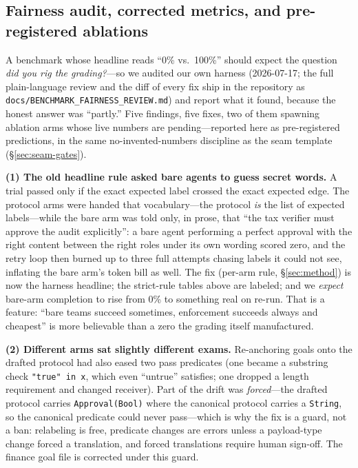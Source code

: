 \documentclass{article}
\begin{document}
\subsection{Fairness audit, corrected metrics, and pre-registered ablations}\label{sec:fairaudit}
A benchmark whose headline reads ``0\% vs.\ 100\%'' should expect the question \emph{did you rig the grading?}---so we audited our own harness (2026-07-17; the full plain-language review and the diff of every fix ship in the repository as \texttt{docs/BENCHMARK\_FAIRNESS\_REVIEW.md}) and report what it found, because the honest answer was ``partly.'' Five findings, five fixes, two of them spawning ablation arms whose live numbers are pending---reported here as pre-registered predictions, in the same no-invented-numbers discipline as the seam template (\S\ref{sec:seam-gates}).

\textbf{(1) The old headline rule asked bare agents to guess secret words.} A trial passed only if the exact expected label crossed the exact expected edge. The protocol arms were handed that vocabulary---the protocol \emph{is} the list of expected labels---while the bare arm was told only, in prose, that ``the tax verifier must approve the audit explicitly'': a bare agent performing a perfect approval with the right content between the right roles under its own wording scored zero, and the retry loop then burned up to three full attempts chasing labels it could not see, inflating the bare arm's token bill as well. The fix (per-arm rule, \S\ref{sec:method}) is now the harness headline; the strict-rule tables above are labeled; and we \emph{expect} bare-arm completion to rise from 0\% to something real on re-run. That is a feature: ``bare teams succeed sometimes, enforcement succeeds always and cheapest'' is more believable than a zero the grading itself manufactured.

\textbf{(2) Different arms sat slightly different exams.} Re-anchoring goals onto the drafted protocol had also eased two pass predicates (one became a substring check \texttt{"true" in x}, which even ``untrue'' satisfies; one dropped a length requirement and changed receiver). Part of the drift was \emph{forced}---the drafted protocol carries \texttt{Approval(Bool)} where the canonical protocol carries a \texttt{String}, so the canonical predicate could never pass---which is why the fix is a guard, not a ban: relabeling is free, predicate changes are errors unless a payload-type change forced a translation, and forced translations require human sign-off. The finance goal file is corrected under this guard.
\end{document}
